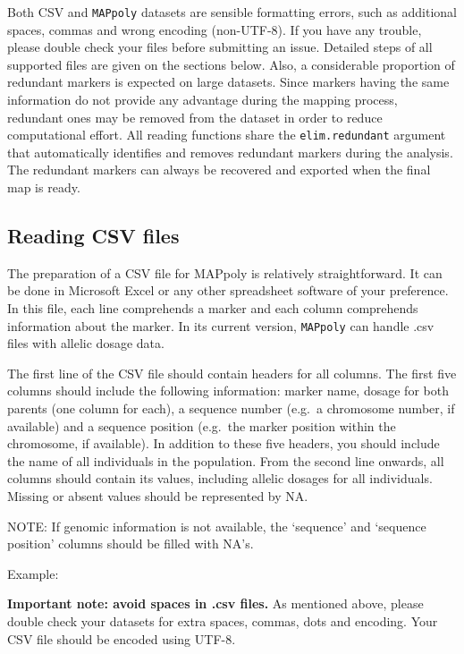 \documentclass[
]{article}
\begin{document}
Both CSV and \texttt{MAPpoly} datasets are sensible formatting errors,
such as additional spaces, commas and wrong encoding (non-UTF-8). If you
have any trouble, please double check your files before submitting an
issue. Detailed steps of all supported files are given on the sections
below. Also, a considerable proportion of redundant markers is expected
on large datasets. Since markers having the same information do not
provide any advantage during the mapping process, redundant ones may be
removed from the dataset in order to reduce computational effort. All
reading functions share the \texttt{elim.redundant} argument that
automatically identifies and removes redundant markers during the
analysis. The redundant markers can always be recovered and exported
when the final map is ready.

\hypertarget{reading-csv-files}{%
\subsection{Reading CSV files}\label{reading-csv-files}}

The preparation of a CSV file for MAPpoly is relatively straightforward.
It can be done in Microsoft Excel or any other spreadsheet software of
your preference. In this file, each line comprehends a marker and each
column comprehends information about the marker. In its current version,
\texttt{MAPpoly} can handle .csv files with allelic dosage data.

The first line of the CSV file should contain headers for all columns.
The first five columns should include the following information: marker
name, dosage for both parents (one column for each), a sequence number
(e.g.~a chromosome number, if available) and a sequence position
(e.g.~the marker position within the chromosome, if available). In
addition to these five headers, you should include the name of all
individuals in the population. From the second line onwards, all columns
should contain its values, including allelic dosages for all
individuals. Missing or absent values should be represented by NA.

NOTE: If genomic information is not available, the `sequence' and
`sequence position' columns should be filled with NA's.

Example:

\textbf{Important note: avoid spaces in .csv files.} As mentioned above,
please double check your datasets for extra spaces, commas, dots and
encoding. Your CSV file should be encoded using UTF-8.
\end{document}
